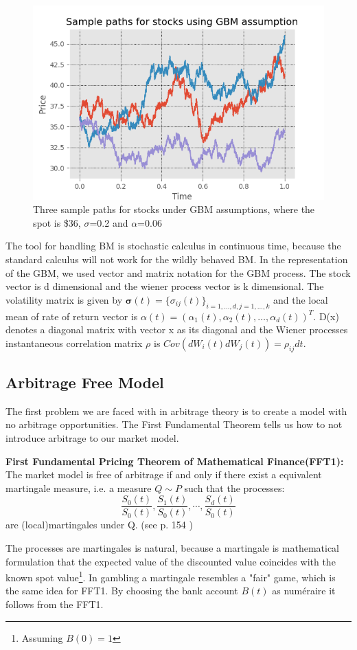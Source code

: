 \begin{figure}[H]
\centering
\includegraphics{Figures/samplePath.png}
\decoRule
\caption[Sample Path For Stocks]{Three sample paths for stocks under GBM assumptions, where the spot is \$36, $\sigma$=0.2 and $\alpha$=0.06}
\label{fig:BM}
\end{figure}


The tool for handling BM is stochastic calculus in continuous time, because the standard calculus will not work for the wildly behaved BM. In the representation of the GBM, we used vector and matrix notation for the GBM process. The stock vector is d dimensional and the wiener process vector is k dimensional. The volatility matrix is given by $\bm{\sigma}(t)=\{\sigma_{ij}(t)\}_{i=1,\ldots,d,j=1,\ldots,k}$ and the local mean of rate of return vector is $\alpha(t)=(\alpha_1(t), \alpha_2(t), \ldots, \alpha_d(t))^T$. D(x) denotes a diagonal matrix with vector x as its diagonal and the Wiener processes instantaneous correlation matrix $\rho$ is $Cov(dW_i(t)dW_j(t))=\rho_{ij}dt$.

\subsection{Arbitrage Free Model}
The first problem we are faced with in arbitrage theory is to create a model with no arbitrage opportunities. The First Fundamental Theorem tells us how to not introduce arbitrage to our market model.
\begin{theorem}\label{FFT1}
\textbf{First Fundamental Pricing Theorem of Mathematical Finance(FFT1): } The market model is free of arbitrage if and only if there exist a equivalent martingale measure, i.e. a measure $Q\sim P$ such that the processes:
$$\frac{S_0(t)}{S_0(t)}, \frac{S_1(t)}{S_0(t)}, \cdots, \frac{S_d(t)}{S_0(t)}$$
are (local)martingales under Q.
(see p. 154 \parencite{finKont})
\end{theorem}
The processes are martingales is natural, because a martingale is mathematical formulation that the expected value of the discounted value coincides with the known spot value\footnote{Assuming $B(0)=1$}. In gambling a martingale resembles a "fair" game, which is the same idea for FFT1. By choosing the bank account $B(t)$ as numéraire it follows from the FFT1.

